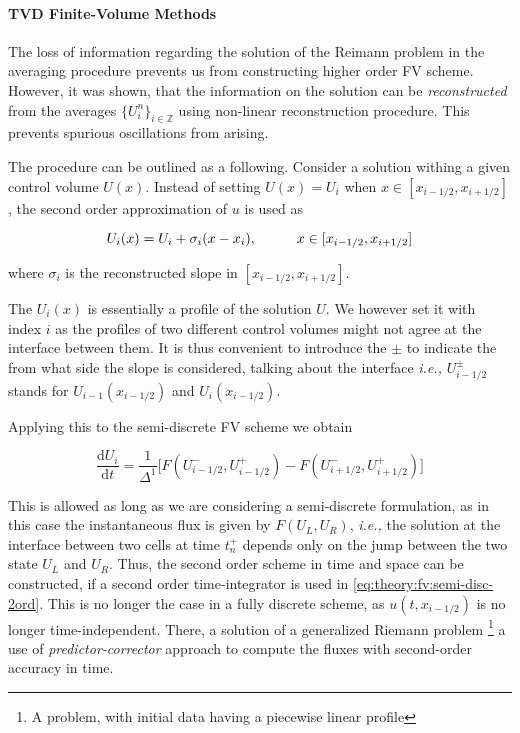 \paragraph{TVD Finite-Volume Methods}


The loss of information regarding the solution of the Reimann problem in the averaging procedure prevents us from constructing higher order FV scheme. 
However, it was shown, that the information on the solution can be \textit{reconstructed} from the averages $\{U_i ^n\}_{i\in\mathbb{Z}}$ using non-linear reconstruction procedure. 
This prevents spurious oscillations from arising. 

The procedure can be outlined as a following. 
Consider a solution withing a given control volume $U(x)$. 
Instead of setting $U(x) = U_i$ when $x\in[x_{i-1/2},x_{i+1/2}]$, the second order approximation of $u$ is used as 

\begin{equation}
U_i(x) = U_i + \sigma_i(x-x_i), \hspace{10mm}x\in[x_{i-1/2},x_{i+1/2}]
\end{equation}

where $\sigma_i$ is the reconstructed slope in $[x_{i-1/2},x_{i+1/2}]$. 

The $U_i(x)$ is essentially a profile of the solution $U$. 
We however set it with index $i$ as the profiles of two different control volumes might not agree at the interface between them. 
It is thus convenient to introduce the $\pm$ to indicate the from what side the slope is considered, talking about the interface \textit{i.e.,} $U^{\pm} _{i-1/2}$ stands for $U_{i-1}(x_{i-1/2})$ and $U_i(x_{i-1/2})$. 

Applying this to the semi-discrete FV scheme we obtain 

\begin{equation}
\frac{\text{d} U_i}{\text{d}t} = \frac{1}{\Delta^1}\big[F(U^{-}_{i-1/2},U^{+}_{i-1/2}) - F(U^{-}_{i+1/2},U^{+}_{i+1/2})\big]
\label{eq:theory:fv:semi-disc-2ord}
\end{equation}

This is allowed as long as we are considering a semi-discrete formulation, as in this case the instantaneous flux is given by $F(U_L, U_R)$, \textit{i.e.,} the solution at the interface between two cells at time $t_n ^+$ depends only on the jump between the two state $U_L$ and $U_R$. 
Thus, the second order scheme in time and space can be constructed, if a second order time-integrator is used in \ref{eq:theory:fv:semi-disc-2ord}. 
This is no longer the case in a fully discrete scheme, as $u(t, x_{i-1/2})$ is no longer time-independent. There, a solution of a generalized Riemann problem \footnote{A problem, with initial data having a piecewise linear profile} a use of \textit{predictor-corrector} approach to compute the fluxes with second-order accuracy in time. \\

